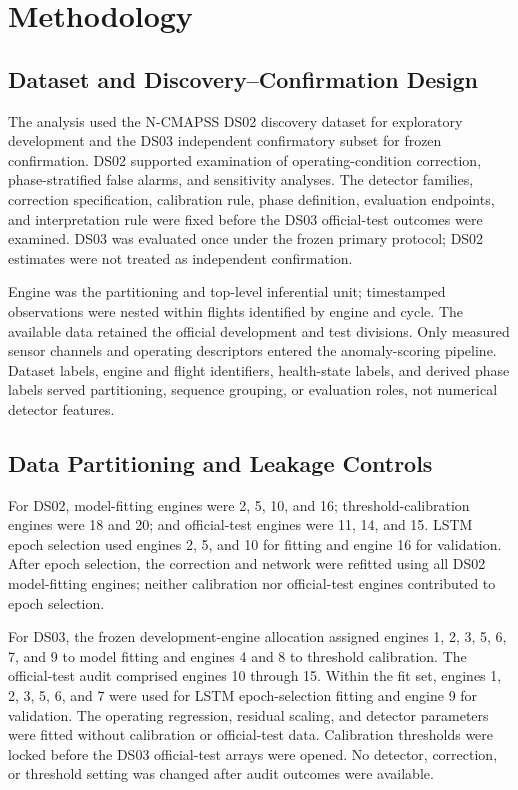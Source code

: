 \documentclass[10pt,conference]{IEEEtran}
\begin{document}
\section{Methodology}\label{methodology}

\subsection{Dataset and Discovery--Confirmation Design}\label{dataset-and-discoveryconfirmation-design}

The analysis used the N-CMAPSS DS02 discovery dataset for exploratory development and the DS03 independent confirmatory subset for frozen confirmation. DS02 supported examination of operating-condition correction, phase-stratified false alarms, and sensitivity analyses. The detector families, correction specification, calibration rule, phase definition, evaluation endpoints, and interpretation rule were fixed before the DS03 official-test outcomes were examined. DS03 was evaluated once under the frozen primary protocol; DS02 estimates were not treated as independent confirmation.

Engine was the partitioning and top-level inferential unit; timestamped observations were nested within flights identified by engine and cycle. The available data retained the official development and test divisions. Only measured sensor channels and operating descriptors entered the anomaly-scoring pipeline. Dataset labels, engine and flight identifiers, health-state labels, and derived phase labels served partitioning, sequence grouping, or evaluation roles, not numerical detector features.

\subsection{Data Partitioning and Leakage Controls}\label{data-partitioning-and-leakage-controls}

For DS02, model-fitting engines were 2, 5, 10, and 16; threshold-calibration engines were 18 and 20; and official-test engines were 11, 14, and 15. LSTM epoch selection used engines 2, 5, and 10 for fitting and engine 16 for validation. After epoch selection, the correction and network were refitted using all DS02 model-fitting engines; neither calibration nor official-test engines contributed to epoch selection.

For DS03, the frozen development-engine allocation assigned engines 1, 2, 3, 5, 6, 7, and 9 to model fitting and engines 4 and 8 to threshold calibration. The official-test audit comprised engines 10 through 15. Within the fit set, engines 1, 2, 3, 5, 6, and 7 were used for LSTM epoch-selection fitting and engine 9 for validation. The operating regression, residual scaling, and detector parameters were fitted without calibration or official-test data. Calibration thresholds were locked before the DS03 official-test arrays were opened. No detector, correction, or threshold setting was changed after audit outcomes were available.
\end{document}
